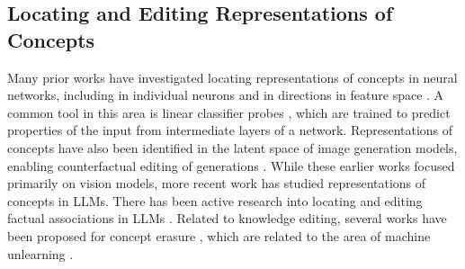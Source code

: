 \subsection{Locating and Editing Representations of Concepts}
\vspace{-5pt}
Many prior works have investigated locating representations of concepts in neural networks, including in individual neurons \citep{bau2017network} and in directions in feature space \citep{bau2017network, fong2018net2vec, zhou2018interpretable, kim2018interpretability}. A common tool in this area is linear classifier probes \citep{alain2017probes, belinkov2022probing}, which are trained to predict properties of the input from intermediate layers of a network. Representations of concepts have also been identified in the latent space of image generation models, enabling counterfactual editing of generations \citep{radford2015unsupervised, upchurch2017deep, 10.1145/3306346.3323023, shen2020interpreting, bau2020units, ling2021editgan, wang2023concept}. While these earlier works focused primarily on vision models, more recent work has studied representations of concepts in LLMs. There has been active research into locating and editing factual associations in LLMs \citep{meng2023locating, meng2023massediting, zhong2023mquake, hernandez2023inspecting}. Related to knowledge editing, several works have been proposed for concept erasure \citep{shao2023gold, kleindessner2023efficient, belrose2023leace, ravfogel2023kernelized, gandikota2023erasing}, which are related to the area of machine unlearning \citep{shaik2023exploring}.

